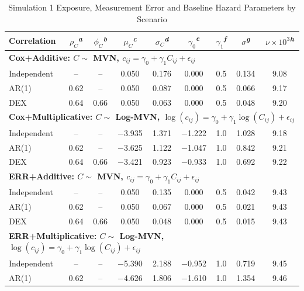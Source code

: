 \begin{table}[!htbp]
\small
\centering
\caption{Simulation 1 Exposure, Measurement Error and Baseline Hazard Parameters by Scenario}
\begin{minipage}{\textwidth}
\centering
\begin{tabular}{|l|c|c|c|c|c|c|c|c|}
\hline
Correlation
& $\rho_C$\textsuperscript{\textit{a}}
& $\phi_C$\textsuperscript{\textit{b}}
& $\mu_C$\textsuperscript{\textit{c}}
& $\sigma_C$\textsuperscript{\textit{d}}
& $\gamma_0$\textsuperscript{\textit{e}}
& $\gamma_1$\textsuperscript{\textit{f}}
& $\sigma$\textsuperscript{\textit{g}}
& $\nu\times 10^{3}$\textsuperscript{\textit{h}} \\
\hline
\multicolumn{9}{|l|}{\bf Cox+Additive: $C\sim$ MVN, $c_{ij}=\gamma_0+\gamma_1 C_{ij}+\epsilon_{ij}$} \\
\hline
Independent & -- & -- & 0.050 & 0.176 & 0.000 & 0.5 & 0.134 & 9.08 \\
AR(1) & 0.62 & -- & 0.050 & 0.087 & 0.000 & 0.5 & 0.066 & 9.17 \\
DEX & 0.64 & 0.66 & 0.050 & 0.063 & 0.000 & 0.5 & 0.048 & 9.20 \\
\hline
\multicolumn{9}{|l|}{\bf Cox+Multiplicative: $C\sim$ Log-MVN, $\log(c_{ij})=\gamma_0+\gamma_1\log(C_{ij})+\epsilon_{ij}$} \\
\hline
Independent & -- & -- & $-$3.935 & 1.371 & $-$1.222 & 1.0 & 1.028 & 9.18 \\
AR(1) & 0.62 & -- & $-$3.625 & 1.122 & $-$1.047 & 1.0 & 0.842 & 9.21 \\
DEX & 0.64 & 0.66 & $-$3.421 & 0.923 & $-$0.933 & 1.0 & 0.692 & 9.22 \\
\hline
\multicolumn{9}{|l|}{\bf ERR+Additive: $C\sim$ MVN, $c_{ij}=\gamma_0+\gamma_1 C_{ij}+\epsilon_{ij}$} \\
\hline
Independent & -- & -- & 0.050 & 0.135 & 0.000 & 0.5 & 0.042 & 9.43 \\
AR(1) & 0.62 & -- & 0.050 & 0.067 & 0.000 & 0.5 & 0.021 & 9.43 \\
DEX & 0.64 & 0.66 & 0.050 & 0.048 & 0.000 & 0.5 & 0.015 & 9.43 \\
\hline
\multicolumn{9}{|l|}{\bf ERR+Multiplicative: $C\sim$ Log-MVN, $\log(c_{ij})=\gamma_0+\gamma_1\log(C_{ij})+\epsilon_{ij}$} \\
\hline
Independent & -- & -- & $-$5.390 & 2.188 & $-$0.952 & 1.0 & 0.719 & 9.45 \\
AR(1) & 0.62 & -- & $-$4.626 & 1.806 & $-$1.610 & 1.0 & 1.354 & 9.46 \\

\end{tabular}
\end{minipage}
\end{table}
